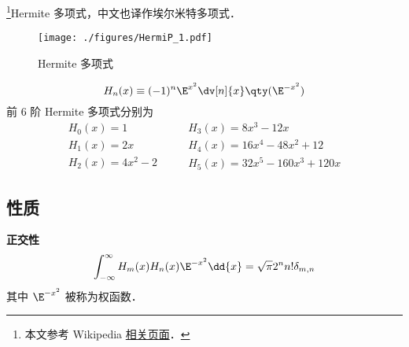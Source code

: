 
\begin{issues}
\issueDraft
\end{issues}

\footnote{本文参考 Wikipedia \href{https://en.wikipedia.org/wiki/Hermite_polynomials}{相关页面}．}Hermite 多项式，中文也译作埃尔米特多项式．

\begin{figure}[ht]
\centering
\texttt{[image: ./figures/HermiP\_1.pdf]}
\caption{Hermite 多项式} \label{HermiP_fig1}
\end{figure}

\begin{equation}
H_n(x) \equiv (- 1)^n \E^{x^2} \dv[n]{x} \qty(\E^{-x^2})
\end{equation}
前 6 阶 Hermite 多项式分别为
\begin{equation}
\begin{array}{l}
H_0(x) = 1\\
H_1(x) = 2x\\
H_2(x) = 4x^2 - 2
\end{array}
\qquad
\begin{array}{l}
H_3(x) = 8x^3 - 12x\\
H_4(x) = 16x^4 - 48x^2 + 12\\
H_5(x) = 32x^5 - 160x^3 + 120x
\end{array}
\end{equation}

\subsection{性质}
\textbf{正交性}
\begin{equation}%
\int_{-\infty}^\infty H_m(x) H_n(x) \E^{-x^2} \dd{x} = \sqrt{\pi}2^n n! \delta_{m,n}
\end{equation}
其中 $\E^{-x^2}$ 被称为权函数．
